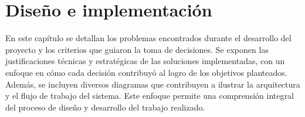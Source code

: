 \chapter{Diseño e implementación} %

\label{Chapter3} %

En este capítulo se detallan los problemas encontrados durante el desarrollo del proyecto y los criterios que guiaron la toma de decisiones. Se exponen las justificaciones técnicas y estratégicas de las soluciones implementadas, con un enfoque en cómo cada decisión contribuyó al logro de los objetivos planteados. Además, se incluyen diversos diagramas que contribuyen a ilustrar la arquitectura y el flujo de trabajo del sistema. Este enfoque permite una comprensión integral del proceso de diseño y desarrollo del trabajo realizado.


